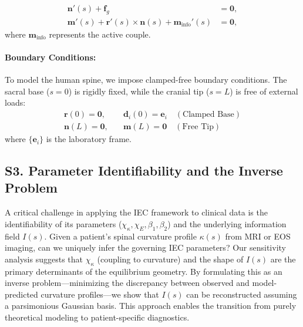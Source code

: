 \documentclass[11pt,a4paper]{article}
\begin{document}
\begin{align}
\mathbf{n}'(s) + \mathbf{f}_g &= \mathbf{0}, \nonumber \\
\mathbf{m}'(s) + \mathbf{r}'(s) \times \mathbf{n}(s) + \mathbf{m}_{\mathrm{info}}'(s) &= \mathbf{0},
\label{eq:cosserat_balance}
\end{align}
where $\mathbf{m}_{\mathrm{info}}$ represents the active couple.

\paragraph{Boundary Conditions:} To model the human spine, we impose clamped-free boundary conditions. The sacral base ($s=0$) is rigidly fixed, while the cranial tip ($s=L$) is free of external loads:
\begin{align}
\mathbf{r}(0) = \mathbf{0}, \quad &\mathbf{d}_i(0) = \mathbf{e}_i \quad (\text{Clamped Base}) \nonumber \\
\mathbf{n}(L) = \mathbf{0}, \quad &\mathbf{m}(L) = \mathbf{0} \quad (\text{Free Tip})
\label{eq:boundary_conditions}
\end{align}
where $\{\mathbf{e}_i\}$ is the laboratory frame.

\subsection*{S3. Parameter Identifiability and the Inverse Problem}

A critical challenge in applying the IEC framework to clinical data is the identifiability of its parameters ($\chi_\kappa, \chi_E, \beta_1, \beta_2$) and the underlying information field $I(s)$. Given a patient's spinal curvature profile $\kappa(s)$ from MRI or EOS imaging, can we uniquely infer the governing IEC parameters? Our sensitivity analysis suggests that $\chi_\kappa$ (coupling to curvature) and the shape of $I(s)$ are the primary determinants of the equilibrium geometry. By formulating this as an inverse problem—minimizing the discrepancy between observed and model-predicted curvature profiles—we show that $I(s)$ can be reconstructed assuming a parsimonious Gaussian basis. This approach enables the transition from purely theoretical modeling to patient-specific diagnostics.
\end{document}
